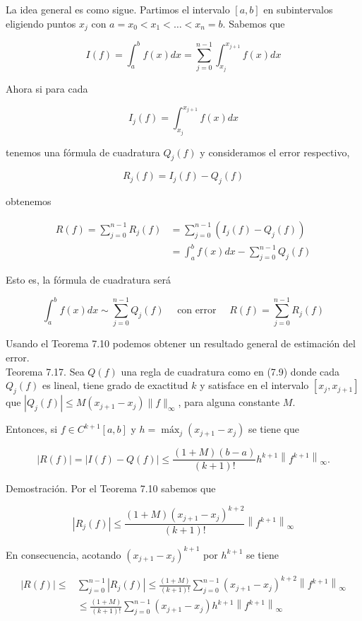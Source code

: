 \documentclass[10pt]{book}
\begin{document}
La idea general es como sigue. Partimos el intervalo $[a, b]$ en subintervalos eligiendo puntos $x_{j}$ con $a=x_{0}<x_{1}<\ldots<x_{n}=b$. Sabemos que

$$
I(f)=\int_{a}^{b} f(x) d x=\sum_{j=0}^{n-1} \int_{x_{j}}^{x_{j+1}} f(x) d x
$$

Ahora si para cada

$$
I_{j}(f)=\int_{x_{j}}^{x_{j+1}} f(x) d x
$$

tenemos una fórmula de cuadratura $Q_{j}(f)$ y consideramos el error respectivo,

$$
R_{j}(f)=I_{j}(f)-Q_{j}(f)
$$

obtenemos

$$
\begin{aligned}
R(f)=\sum_{j=0}^{n-1} R_{j}(f) & =\sum_{j=0}^{n-1}\left(I_{j}(f)-Q_{j}(f)\right) \\
& =\int_{a}^{b} f(x) d x-\sum_{j=0}^{n-1} Q_{j}(f)
\end{aligned}
$$

Esto es, la fórmula de cuadratura será


\begin{equation*}
\int_{a}^{b} f(x) d x \sim \sum_{j=0}^{n-1} Q_{j}(f) \quad \text { con error } \quad R(f)=\sum_{j=0}^{n-1} R_{j}(f) \tag{7.9}
\end{equation*}


Usando el Teorema 7.10 podemos obtener un resultado general de estimación del error.\\
Teorema 7.17. Sea $Q(f)$ una regla de cuadratura como en (7.9) donde cada $Q_{j}(f)$ es lineal, tiene grado de exactitud $k$ y satisface en el intervalo $\left[x_{j}, x_{j+1}\right]$ que $\left|Q_{j}(f)\right| \leq M\left(x_{j+1}-x_{j}\right)\|f\|_{\infty}$, para alguna constante $M$.

Entonces, si $f \in C^{k+1}[a, b]$ y $h=\operatorname{máx}_{j}\left(x_{j+1}-x_{j}\right)$ se tiene que

$$
|R(f)|=|I(f)-Q(f)| \leq \frac{(1+M)(b-a)}{(k+1)!} h^{k+1}\left\|f^{k+1}\right\|_{\infty} .
$$

Demostración. Por el Teorema 7.10 sabemos que

$$
\left|R_{j}(f)\right| \leq \frac{(1+M)\left(x_{j+1}-x_{j}\right)^{k+2}}{(k+1)!}\left\|f^{k+1}\right\|_{\infty}
$$

En consecuencia, acotando $\left(x_{j+1}-x_{j}\right)^{k+1}$ por $h^{k+1}$ se tiene

$$
\begin{aligned}
|R(f)| \leq & \sum_{j=0}^{n-1}\left|R_{j}(f)\right| \leq \frac{(1+M)}{(k+1)!} \sum_{j=0}^{n-1}\left(x_{j+1}-x_{j}\right)^{k+2}\left\|f^{k+1}\right\|_{\infty} \\
& \leq \frac{(1+M)}{(k+1)!} \sum_{j=0}^{n-1}\left(x_{j+1}-x_{j}\right) h^{k+1}\left\|f^{k+1}\right\|_{\infty}
\end{aligned}
$$
\end{document}
